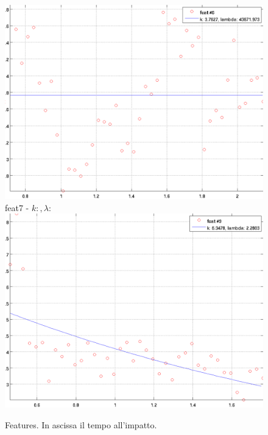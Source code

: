 \documentclass[12pt]{report}
\begin{document}
\begin{figure}
\begin{minipage}[t]{0.3\linewidth}
	\includegraphics[scale=\imFeatScale, angle=90]{images/feat6}
	feat7 - $k: , \lambda:  $\\
	\includegraphics[scale=\imFeatScale, angle=90]{images/feat9}
\end{minipage}
\caption[short]{Features. In ascissa il tempo all'impatto.}
\label{fig:feats}
\end{figure}
\end{document}
